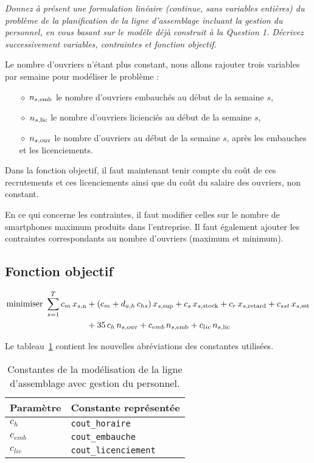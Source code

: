 \question %
\emph{Donnez à présent une formulation linéaire (continue, sans variables
entières) du problème de la planification de la ligne d'assemblage
incluant la gestion du personnel, en vous basant sur le modèle déjà
construit à la Question 1. Décrivez successivement variables,
contraintes et fonction objectif.}

Le nombre d'ouvriers n'étant plus constant, nous allons rajouter trois variables
par semaine pour modéliser le problème :
\begin{itemize}
  \item[$\diamond$] $n_{s,\text{emb}}$ le nombre d'ouvriers embauchés au début de la semaine $s$,
  \item[$\diamond$] $n_{s,\text{lic}}$ le nombre d'ouvriers licienciés au début de la semaine $s$,
  \item[$\diamond$] $n_{s,\text{ouv}}$ le nombre d'ouvriers au début de la semaine $s$,
  après les embauches et les licenciements.
\end{itemize}

Dans la fonction objectif, il faut maintenant tenir compte du coût de
ces recrutements et ces licenciements
ainsi que du coût du salaire des ouvriers, non constant.

En ce qui concerne les contraintes, il faut modifier celles sur
le nombre de smartphones maximum produits dans l'entreprise.
Il faut également ajouter les contraintes correspondants
au nombre d'ouvriers (maximum et minimum).

\subsection*{Fonction objectif}
\begin{align*}
  \mbox{minimiser }
  \sum_{s=1}^{T}
  c_m\, x_{s,\text{n}} &+ (c_m + d_{a,h} \, c_{hs})\, x_{s,\text{sup}}
  + c_s\, x_{s,\text{stock}} + c_r\, x_{s,\text{retard}} + c_{sst}\, x_{s,\text{sst}} \\
  &+ 35 \, c_{h} \, n_{s,\text{ouv}}
  + c_{emb} \, n_{s,\text{emb}} + c_{lic} \, n_{s,\text{lic}}
\end{align*}

Le tableau~\ref{tab:constantesQuestion7} contient les nouvelles abréviations
des constantes utilisées.
\begin{table}[h]
  \begin{center}
  \begin{tabular}{|l|l|}
    \hline
    Paramètre & Constante représentée \\
    \hline
    \hline
    $c_{h}$ & \texttt{cout\_horaire} \\
    \hline
    $c_{emb}$ & \texttt{cout\_embauche} \\
    \hline
    $c_{lic}$ & \texttt{cout\_licenciement} \\
    \hline
  \end{tabular}
  \caption{Constantes de la modélisation de la ligne d'assemblage
  avec gestion du personnel.}
  \label{tab:constantesQuestion7}
  \end{center}
\end{table}

